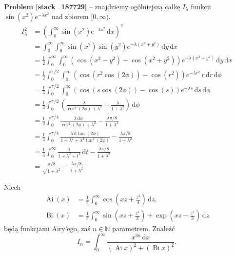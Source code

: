 \textbf{Problem \ref{stack_187729}} -- znajdziemy ogólniejszą całkę $I_\lambda$ funkcji $\sin(x^2) e^{-\lambda x^2}$ nad zbiorem $[0, \infty)$. %
\begin{align} %
    I_\lambda^2 & = \left(\int_0^\infty \sin(x^2) e^{-\lambda x^2} \,\mathrm{d}x \right)^2 \\ %
    & = \int_0^\infty \int_0^\infty \sin(x^2)\sin(y^2) e^{- \lambda(x^2+y^2)}\,\mathrm{d}y\,\mathrm{d}x \\ %
    & = \frac12 \int_0^\infty \int_0^\infty \left(\cos(x^2-y^2)-\cos(x^2+y^2)\right) e^{- \lambda(x^2+y^2)}\,\mathrm{d}y\,\mathrm{d}x \\ %
    & = \frac12 \int_0^{\pi/2} \int_0^\infty \left(\cos(r^2\cos(2\phi))-\cos(r^2)\right)e^{- \lambda r^2} \,r\,\mathrm{d}r\,\mathrm{d}\phi \\ %
    & = \frac14 \int_0^{\pi/2} \int_0^\infty \left(\cos(s\cos(2\phi))-\cos(s)\right) e^{- \lambda s} \,\mathrm{d}s\,\mathrm{d}\phi \\ %
    & = \frac14 \int_0^{\pi/2} \left( \frac{ \lambda}{\cos^2(2\phi)+ \lambda^2} - \frac{ \lambda}{1+ \lambda^2}\right)\,\mathrm{d}\phi \\ %
    & = \frac12 \int_0^{\pi/4} \frac{ \lambda\,\mathrm{d}\phi}{\cos^2(2\phi)+ \lambda^2} - \frac{ \lambda\pi/8}{1+ \lambda^2} \\ %
    & = \frac14 \int_0^{\pi/4} \frac{ \lambda\,\mathrm{d} \tan(2\phi)} {1+ \lambda^2+ \lambda^2 \tan^2(2\phi)} - \frac{ \lambda\pi/8}{1+ \lambda^2} \\ %
    & = \frac14 \int_0^\infty \frac1{1+ \lambda^2+t^2}\,\mathrm{d}t - \frac{ \lambda\pi/8}{1+ \lambda^2} \\ %
    & = \frac{\pi/8}{\sqrt{1+ \lambda^2}} - \frac{ \lambda\pi/8}{1+ \lambda^2} %
\end{align} %

\begin{problem}[pytanie 507425]
    \label{stack_507425}%
    Niech
    \begin{align}
        \operatorname{Ai} (x) & = \frac 1 \pi \int_0^\infty \cos \left( x z + \frac {z^3} 3 \right) \,\mathrm{d}z, \\
        \operatorname{Bi} (x) & = \frac 1 \pi \int_0^\infty \sin \left( x z + \frac {z^3} 3 \right) + \exp \left( x z - \frac {z^3} 3 \right) \,\mathrm{d}z
    \end{align}
    będą funkcjami Airy'ego, zaś $n \in \mathbb N$ parametrem.
    Znaleźć
    \begin{equation}
        I_n = \int_0^\infty \frac{x^{3n} \,\mathrm{d} x}{(\operatorname{Ai} x)^2 + (\operatorname{Bi} x)^2}.
    \end{equation}
\end{problem}

